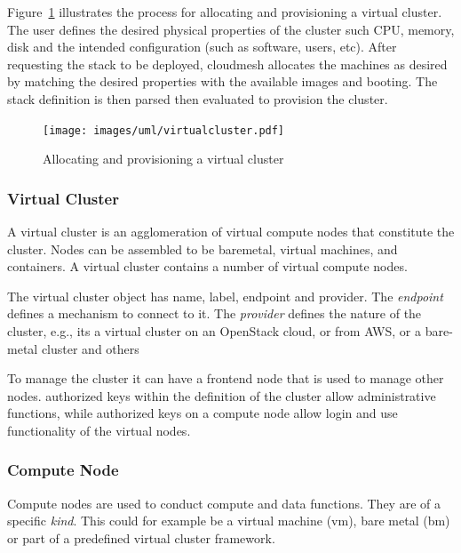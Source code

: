 \documentclass[10pt]{article}
\begin{document}
Figure~\ref{F:uml-virtualcluster} illustrates the process for
allocating and provisioning a virtual cluster.  The user defines the
desired physical properties of the cluster such CPU, memory, disk and
the intended configuration (such as software, users, etc).  After
requesting the stack to be deployed, cloudmesh allocates the machines
as desired by matching the desired properties with the available
images and booting. The stack definition is then parsed then evaluated
to provision the cluster.


\begin{figure}[!h]
\centering
\texttt{[image: images/uml/virtualcluster.pdf]}
\caption{Allocating and provisioning a virtual cluster}\label{F:uml-virtualcluster}
\end{figure}


\subsubsection{Virtual Cluster}

A virtual cluster is an agglomeration of virtual compute nodes that
constitute the cluster. Nodes can be assembled to be baremetal,
virtual machines, and containers. A virtual cluster contains a number
of virtual compute nodes.  

The virtual cluster object has name, label, endpoint and provider. The
\textit{endpoint} defines a mechanism to connect to it. The
\textit{provider} defines the nature of the cluster, e.g., its a
virtual cluster on an OpenStack cloud, or from AWS, or a bare-metal
cluster and others

To manage the cluster it can have a frontend node that is used to
manage other nodes. authorized keys within the definition of the
cluster allow administrative functions, while authorized keys on a
compute node allow login and use functionality of the virtual nodes.




\subsubsection{Compute Node}

Compute nodes are used to conduct compute and data functions. They are
of a specific {\it kind}. This could for example be a virtual machine
(vm), bare metal (bm) or part of a predefined virtual cluster
framework. 
\end{document}
